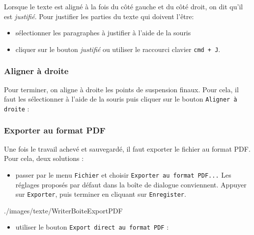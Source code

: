 Lorsque le texte est aligné à la fois du côté gauche et du côté droit, on dit qu'il est \emph{justifié}. Pour justifier les parties du texte qui doivent l'être:

\begin{itemize}
\item sélectionner les paragraphes à justifier à l'aide de la souris
\item cliquer sur le bouton \emph{justifié} ou utiliser le raccourci clavier \texttt{cmd + J}. 
\end{itemize}






\subsubsection{Aligner à droite}  

Pour terminer, on aligne à droite les points de suspension finaux. Pour cela, il faut les sélectionner à l'aide de la souris puis cliquer sur le bouton \texttt{Aligner à droite} :  




\subsubsection{Exporter au format PDF}

Une fois le travail achevé et sauvegardé, il faut exporter le fichier au format PDF. Pour cela, deux solutions :
\begin{itemize}\item passer par le menu \texttt{Fichier} et choisir \texttt{Exporter au format PDF...} Les réglages proposés par défaut dans la boîte de dialogue conviennent. Appuyer sur \texttt{Exporter}, puis terminer en cliquant sur \texttt{Enregister}.\end{itemize} 

%
                {./images/texte/WriterBoiteExportPDF}{\textwidth}

\begin{itemize}\item utiliser le bouton \texttt{Export direct au format PDF} :\end{itemize} 

